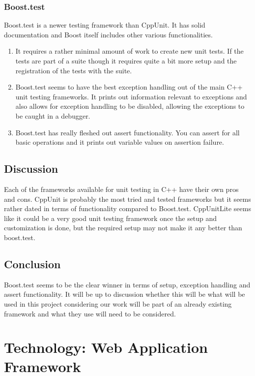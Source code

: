 \documentclass[onecolumn, draftclsnofoot,10pt, compsoc]{IEEEtran}
\begin{document}
\subsubsection{Boost.test}
Boost.test is a newer testing framework than CppUnit. It has solid documentation and Boost itself includes other various functionalities.
\begin{enumerate}
\item It requires a rather minimal amount of work to create new unit tests. If the tests are part of a suite though it requires quite a bit more setup and the registration of the tests with the suite.
\item Boost.test seems to have the best exception handling out of the main C++ unit testing frameworks. It prints out information relevant to exceptions and also allows for exception handling to be disabled, allowing the exceptions to be caught in a debugger.
\item Boost.test has really fleshed out assert functionality. You can assert for all basic operations and it prints out variable values on assertion failure.
\end{enumerate}

\subsection{Discussion}
Each of the frameworks available for unit testing in C++ have their own pros and cons. 
CppUnit is probably the most tried and tested frameworks but it seems rather dated in terms of functionality compared to Boost.test. 
CppUnitLite seems like it could be a very good unit testing framework once the setup and customization is done, but the required setup may not make it any better than boost.test.

\subsection{Conclusion}
Boost.test seems to be the clear winner in terms of setup, exception handling and assert functionality. 
It will be up to discussion whether this will be what will be used in this project considering our work will be part of an already existing framework and what they use will need to be considered.

\section{Technology: Web Application Framework}
\end{document}
